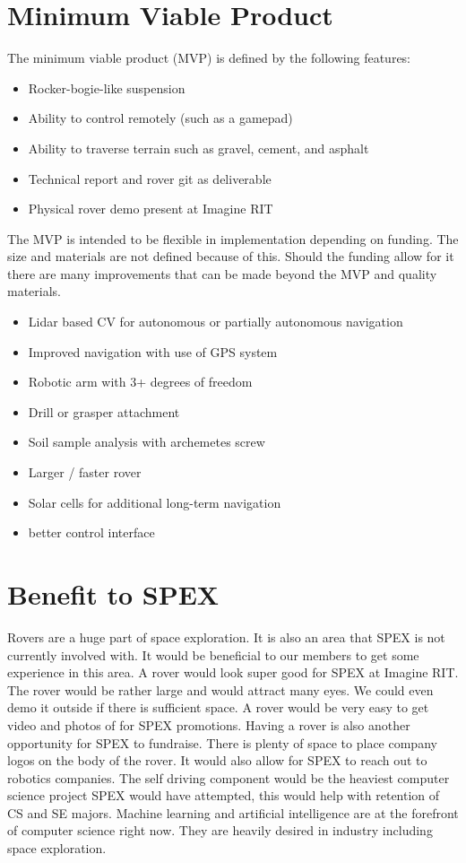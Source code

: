 \documentclass[conference]{IEEEtran} %
\begin{document}
\section{Minimum Viable Product}
\label{sec:mvp}
  The minimum viable product (MVP) is defined by the following features: 

\begin{itemize}
  \item Rocker-bogie-like suspension
  \item Ability to control remotely (such as a gamepad)
  \item Ability to traverse terrain such as gravel, cement, and asphalt
  \item Technical report and rover git as deliverable
  \item Physical rover demo present at Imagine RIT
\end{itemize}

  The MVP is intended to be flexible in implementation depending on funding. The size and materials are not defined because of this. Should the funding allow for it there are many improvements that can be made beyond the MVP and quality materials. 

\begin{itemize}
  \item Lidar based CV for autonomous or partially autonomous navigation
  \item Improved navigation with use of GPS system
  \item Robotic arm with 3+ degrees of freedom
    \item Drill or grasper attachment
  \item Soil sample analysis with archemetes screw
  \item Larger / faster rover
  \item Solar cells for additional long-term navigation
  \item better control interface  
\end{itemize}

\section{Benefit to SPEX}
\label{sec:benefit}

Rovers are a huge part of space exploration. It is also an area that SPEX is not currently involved with. 
It would be beneficial to our members to get some experience in this area.
A rover would look super good for SPEX at Imagine RIT. 
The rover would be rather large and would attract many eyes. We could even demo it outside if there is sufficient space. 
A rover would be very easy to get video and photos of for SPEX promotions. 
Having a rover is also another opportunity for SPEX to fundraise. 
There is plenty of space to place company logos on the body of the rover. 
It would also allow for SPEX to reach out to robotics companies.
The self driving component would be the heaviest computer science project SPEX would have attempted, this would help with retention of CS and SE majors. 
Machine learning and artificial intelligence are at the forefront of computer science right now. 
They are heavily desired in industry including space exploration.
\end{document}
